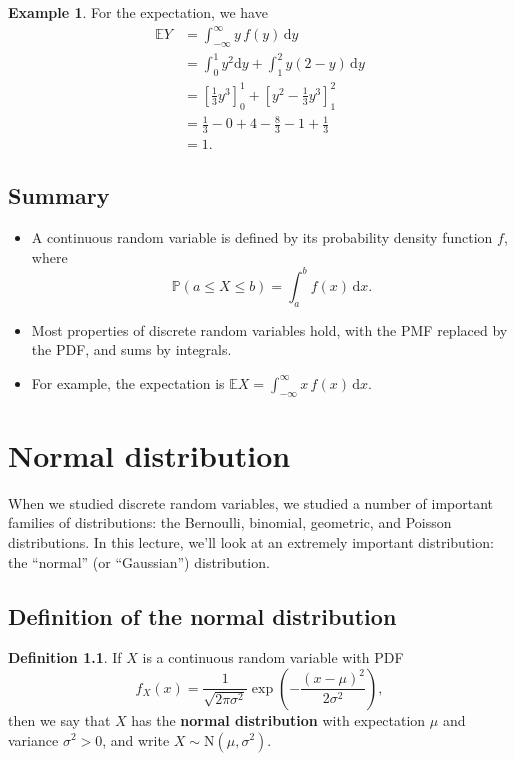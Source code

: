 \documentclass[
  a4paper,
]{book}
\providecommand{\tightlist}{%
  \setlength{\itemsep}{0pt}\setlength{\parskip}{0pt}}
\theoremstyle{definition}
\newtheorem{definition}{Definition}[chapter]
\theoremstyle{definition}
\newtheorem{example}{Example}[chapter]
\theoremstyle{definition}
\theoremstyle{definition}
\theoremstyle{remark}
\begin{document}
\begin{example}
For the expectation, we have
\begin{align*}
\mathbb EY &= \int_{-\infty}^{\infty} y\, f(y) \, \mathrm dy \\
  &= \int_0^1 y^2 \mathrm dy + \int_1^2 y(2 - y)\, \mathrm dy \\
  &= \left[ \tfrac13 y^3 \right]_0^1 + \left[  y^2 - \tfrac13 y^3 \right]_1^2 \\
  &= \tfrac13 - 0 + 4 - \tfrac83 - 1 + \tfrac13 \\
  &= 1 .
\end{align*}
\end{example}

\hypertarget{summary-L15}{%
\section*{Summary}\label{summary-L15}}

\begin{itemize}
\tightlist
\item
  A continuous random variable is defined by its probability density function \(f\), where
  \[ \mathbb P(a \leq X \leq b) = \int_a^b f(x) \, \mathrm dx . \]
\item
  Most properties of discrete random variables hold, with the PMF replaced by the PDF, and sums by integrals.
\item
  For example, the expectation is \(\mathbb EX = \displaystyle\int_{-\infty}^\infty x\, f(x) \, \mathrm dx\).
\end{itemize}

\hypertarget{L16-normal}{%
\chapter{Normal distribution}\label{L16-normal}}

When we studied discrete random variables, we studied a number of important families of distributions: the Bernoulli, binomial, geometric, and Poisson distributions. In this lecture, we'll look at an extremely important distribution: the ``normal'' (or ``Gaussian'') distribution.

\hypertarget{normal-definition}{%
\section{Definition of the normal distribution}\label{normal-definition}}

\begin{definition}
If \(X\) is a continuous random variable with PDF
\[ f_X(x) = \frac{1}{\sqrt{2\pi\sigma^2}} \exp \left( - \frac{(x - \mu)^2}{2\sigma^2} \right) , \]
then we say that \(X\) has the \textbf{normal distribution} with expectation \(\mu\) and variance \(\sigma^2 > 0\), and write \(X \sim \mathrm N(\mu,\sigma^2)\).
\end{definition}
\end{document}
